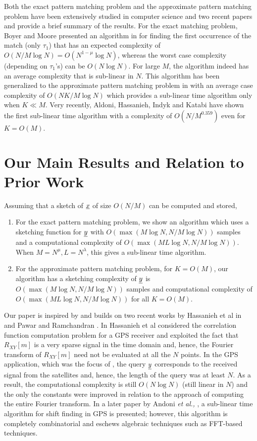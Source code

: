 Both the exact pattern matching problem and the approximate pattern matching problem have been extensively studied in computer science and two recent papers \cite{andoni2013shift} and \cite{amir2004faster} provide a brief summary of the results. For the exact matching problem, Boyer and Moore presented an algorithm in \cite{boyer1977fast} for finding the first occurrence of the match (only $\tau_1$) that has an expected complexity of $O(N/M \log N) = O(N^{1-\mu} \log N)$, whereas the worst case complexity (depending on $\tau_1$'s) can be $O(N \log N)$. For large $M$, the algorithm indeed has an average complexity that is sub-linear in $N$. This algorithm has been generalized to the approximate pattern matching problem in \cite{chang1994approximate} with an average case complexity of $O(NK/M \log N)$ which provides a sub-linear time algorithm only when $K \ll M$. Very recently, Aldoni, Hassanieh, Indyk and Katabi have shown the first sub-linear time algorithm with a complexity of $O(N/M^{0.359})$ even for $K = O(M)$.

\section{Our Main Results and Relation to Prior Work}
\label{sec:mainresults}
Assuming that a sketch of $\underline{x}$ of size $O(N/M)$ can be computed and stored,
\begin{enumerate}
  \item For the exact pattern matching problem, we show an algorithm which uses a sketching function for $\underline{y}$ with $O(\max(M \log N, N/M \log N))$ samples and a computational complexity of $O(\max(ML \log N, N/M \log N))$. When $M = N^\mu, L = N^\lambda$, this gives a sub-linear time algorithm.

  \item For the approximate pattern matching problem, for $K = O(M)$, our algorithm has a sketching complexity of $\underline{y}$ is $O(\max(M \log N, N/M \log N))$ samples and computational complexity of $O(\max(ML \log N, N/M \log N))$ for all $K = O(M)$.
\end{enumerate}

Our paper is inspired by and builds on two recent works by Hassanieh et al in \cite{hassanieh2012faster} and Pawar and Ramchandran \cite{pawar2014robust}. In \cite{hassanieh2012faster} Hassanieh et al considered the correlation function computation problem for a GPS receiver and exploited the fact that $R_{XY}[m]$ is a very sparse signal in the time domain and, hence, the Fourier transform of $R_{XY}[m]$ need not be evaluated at all the $N$ points. In the GPS application, which was the focus of \cite{hassanieh2012faster}, the query $\underline{y}$ corresponds to the received signal from the satellites and, hence, the length of the query was at least $N$. As a result, the computational complexity is still $O(N \log N)$ (still linear in $N$) and the only the constants were improved in relation to the approach of computing the entire Fourier transform. In a later paper by Andoni {\em et al.,} \cite{andoni2013shift}, a sub-linear time algorithm for shift finding in GPS is presented; however, this algorithm is completely combinatorial and eschews algebraic techniques such as FFT-based techniques.

